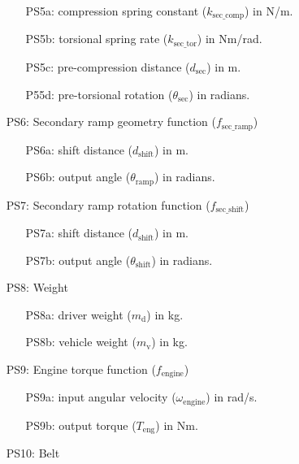 \documentclass[12pt]{article}
\begin{document}
\begin{itemize}
\begin{itemize}
  \item [PS5a:] compression spring constant ($k_{\text{sec\_comp}}$) in N/m.
  \item [PS5b:] torsional spring rate ($k_{\text{sec\_tor}}$) in Nm/rad.
  \item [PS5c:] pre-compression distance ($d_{\text{sec}}$) in m.
  \item [P55d:] pre-torsional rotation ($\theta_{\text{sec}}$) in radians.
\end{itemize}

\item[PS6:] Secondary ramp geometry function ($f_{\text{sec\_ramp}}$)

\begin{itemize}
  \item [PS6a:] shift distance ($d_{\text{shift}}$) in m.
  \item [PS6b:] output angle ($\theta_{\text{ramp}}$) in radians.
\end{itemize}

\item[PS7:] Secondary ramp rotation function ($f_{\text{sec\_shift}}$)

\begin{itemize}
  \item [PS7a:] shift distance ($d_{\text{shift}}$) in m.
  \item [PS7b:] output angle ($\theta_{\text{shift}}$) in radians.
\end{itemize}

\item[PS8:] Weight

\begin{itemize}
  \item [PS8a:] driver weight ($m_{\text{d}}$) in kg.
  \item [PS8b:] vehicle weight ($m_{\text{v}}$) in kg.
\end{itemize}

\item[PS9:] Engine torque function ($f_{\text{engine}}$)

\begin{itemize}
  \item [PS9a:] input angular velocity ($\omega_{\text{engine}}$) in rad/s.
  \item [PS9b:] output torque ($T_{\text{eng}}$) in Nm.
\end{itemize}

\item[PS10:] Belt


\end{itemize}
\end{document}
